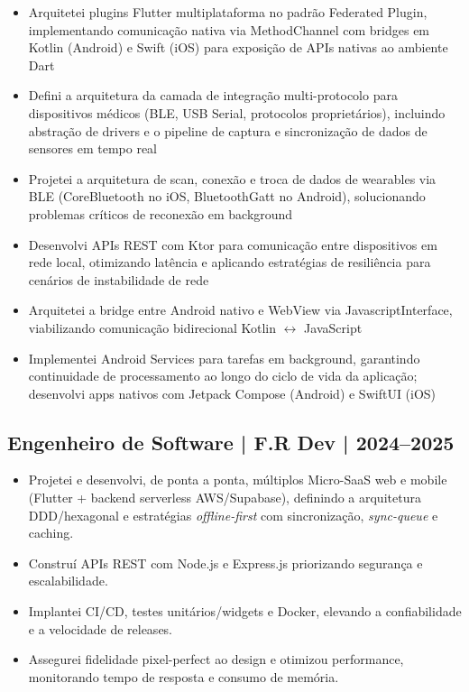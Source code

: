 \documentclass[11pt,a4paper]{article}
\begin{document}
\begin{itemize}[leftmargin=*, itemsep=1pt]
    \item Arquitetei plugins Flutter multiplataforma no padrão Federated Plugin, implementando comunicação nativa via MethodChannel com bridges em Kotlin (Android) e Swift (iOS) para exposição de APIs nativas ao ambiente Dart
    \item Defini a arquitetura da camada de integração multi-protocolo para dispositivos médicos (BLE, USB Serial, protocolos proprietários), incluindo abstração de drivers e o pipeline de captura e sincronização de dados de sensores em tempo real
    \item Projetei a arquitetura de scan, conexão e troca de dados de wearables via BLE (CoreBluetooth no iOS, BluetoothGatt no Android), solucionando problemas críticos de reconexão em background
    \item Desenvolvi APIs REST com Ktor para comunicação entre dispositivos em rede local, otimizando latência e aplicando estratégias de resiliência para cenários de instabilidade de rede
    \item Arquitetei a bridge entre Android nativo e WebView via JavascriptInterface, viabilizando comunicação bidirecional Kotlin $\leftrightarrow$ JavaScript
    \item Implementei Android Services para tarefas em background, garantindo continuidade de processamento ao longo do ciclo de vida da aplicação; desenvolvi apps nativos com Jetpack Compose (Android) e SwiftUI (iOS)
\end{itemize}

\subsection*{Engenheiro de Software | F.R Dev | 2024–2025}

\begin{itemize}[leftmargin=*, itemsep=1pt]
    \item Projetei e desenvolvi, de ponta a ponta, múltiplos Micro-SaaS web e mobile (Flutter + backend serverless AWS/Supabase), definindo a arquitetura DDD/hexagonal e estratégias \textit{offline-first} com sincronização, \textit{sync-queue} e caching.
    \item Construí APIs REST com Node.js e Express.js priorizando segurança e escalabilidade.
    \item Implantei CI/CD, testes unitários/widgets e Docker, elevando a confiabilidade e a velocidade de releases.
    \item Assegurei fidelidade pixel-perfect ao design e otimizou performance, monitorando tempo de resposta e consumo de memória.
\end{itemize}
\end{document}

